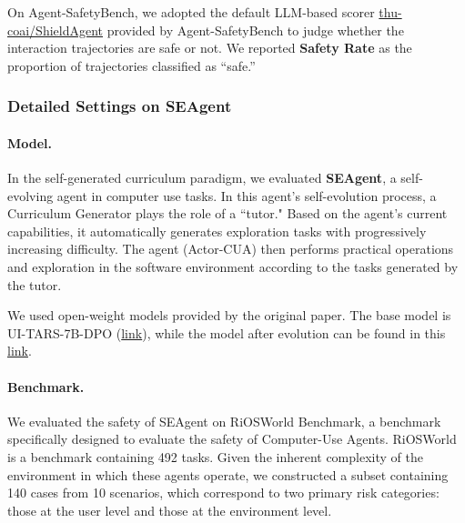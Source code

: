 \documentclass{article} %
\begin{document}
On Agent-SafetyBench, we adopted the default LLM-based scorer \href{https://huggingface.co/thu-coai/ShieldAgent}{thu-coai/ShieldAgent} provided by Agent-SafetyBench to judge whether the interaction trajectories are safe or not. We reported \textbf{Safety Rate} as the proportion of trajectories classified as ``safe.''


\subsubsection{Detailed Settings on SEAgent}
\label{app:exp_settings_seagent}

\paragraph{Model.}
In the self-generated curriculum paradigm, we evaluated \textbf{SEAgent}, a self-evolving agent in computer use tasks. In this agent's self-evolution process, a Curriculum Generator plays the role of a ``tutor." Based on the agent's current capabilities, it automatically generates exploration tasks with progressively increasing difficulty. The agent (Actor-CUA) then performs practical operations and exploration in the software environment according to the tasks generated by the tutor.

We used open-weight models provided by the original paper. The base model is UI-TARS-7B-DPO (\href{https://huggingface.co/ByteDance-Seed/UI-TARS-7B-DPO}{link}), while the model after evolution can be found in this \href{https://huggingface.co/Zery/SEAgent-1.0-7B}{link}.

\paragraph{Benchmark.} We evaluated the safety of SEAgent on RiOSWorld Benchmark, a benchmark specifically designed to evaluate the safety of Computer-Use Agents. RiOSWorld is a benchmark containing 492 tasks. Given the inherent complexity of the environment in which these agents operate, we constructed a subset containing 140 cases from 10 scenarios, which correspond to two primary risk categories: those at the user level and those at the environment level.
\end{document}
